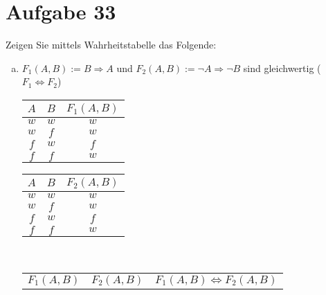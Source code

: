 \section{Aufgabe 33}
\setcounter{section}{33}

Zeigen Sie mittels Wahrheitstabelle das Folgende:
\begin{enumerate}[a)]
    \item $F_1(A, B) := B \Rightarrow A$ und $F_2(A, B) := \lnot A \Rightarrow
        \lnot B$ sind gleichwertig ($F_1 \Leftrightarrow F_2$)
    \begin{table*}[h]
        \centering
        \begin{minipage}{.29\linewidth}
            \centering
            \begin{tabular}{|c|c|c|}
                \hline
                $A$ & $B$ & $F_1(A, B)$ \\
                \hline
                $w$ & $w$ & $w$ \\
                \hline
                $w$ & $f$ & $w$ \\
                \hline
                $f$ & $w$ & $f$ \\
                \hline
                $f$ & $f$ & $w$ \\
                \hline
            \end{tabular}
        \end{minipage}%
        \begin{minipage}{.29\linewidth}
            \centering
            \begin{tabular}{|c|c|c|}
                \hline
                $A$ & $B$ & $F_2(A, B)$ \\
                \hline
                $w$ & $w$ & $w$ \\
                \hline
                $w$ & $f$ & $w$ \\
                \hline
                $f$ & $w$ & $f$ \\
                \hline
                $f$ & $f$ & $w$ \\
                \hline
            \end{tabular}
        \end{minipage}  \\[15pt]
        \begin{minipage}{1\linewidth}
            \centering
            \begin{tabular}{|c|c|c|}
                \hline
                $F_1(A, B)$ & $F_2(A, B)$ & $F_1(A, B) \Leftrightarrow F_2(A, B)$ \\

\end{tabular}
\end{minipage}
\end{table*}
\end{enumerate}
